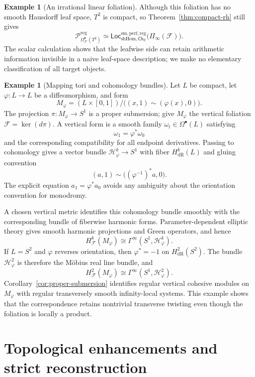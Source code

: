 \documentclass[12pt]{amsart}
\theoremstyle{definition}
\newtheorem{example}[thm]{Example}
\theoremstyle{remark}
\numberwithin{equation}{section}
\newcommand{\CF}{{\mathcal F}}
\newcommand{\R}{{\mathbb{R}}}
\newcommand{\1}{{\mathbb{1}}}
\newcommand{\Ch}{\mathsf{Ch}}
\newcommand{\Loc}{\mathsf{Loc}}
\begin{document}
\begin{example}[An irrational linear foliation]
Although this foliation has no smooth Hausdorff leaf space, $T^2$ is
compact, so Theorem~\ref{thm:compact-rh} still gives
\[
 \mathcal P_{\Omega^\bullet_{\CF}(T^2)}^{\mathrm{reg}}
 \simeq
 \Loc_{\mathrm{shHom},\Ch_{\R}}^{\mathrm{sm,perf,reg}}
 \bigl(\Pi_\infty(\CF)\bigr).
\]
The scalar calculation shows that the leafwise side can retain
arithmetic information invisible in a naive leaf-space description;
we make no elementary classification of all target objects.
\end{example}

\begin{example}[Mapping tori and cohomology bundles]
\label{ex:mapping-torus}
Let $L$ be compact, let $\varphi:L\to L$ be a diffeomorphism, and
form
\[
 M_\varphi
 =
 (L\times[0,1])/
 \bigl((x,1)\sim(\varphi(x),0)\bigr).
\]
The projection $\pi:M_\varphi\to S^1$ is a proper submersion; give
$M_\varphi$ the vertical foliation $\CF=\ker(d\pi)$.  A vertical form
is a smooth family $\omega_t\in\Omega^\bullet(L)$ satisfying
\[
 \omega_1=\varphi^*\omega_0
\]
and the corresponding compatibility for all endpoint derivatives.
Passing to cohomology gives a vector bundle
$\mathcal H_\varphi^k\to S^1$ with fiber
$H^k_{\mathrm{dR}}(L)$ and gluing convention
\[
 (a,1)\sim\bigl((\varphi^{-1})^*a,0\bigr).
\]
The explicit equation $a_1=\varphi^*a_0$ avoids any ambiguity about
the orientation convention for monodromy.

A chosen vertical metric identifies this cohomology bundle smoothly
with the corresponding bundle of fiberwise harmonic forms.
Parameter-dependent elliptic theory gives smooth harmonic
projections and Green operators, and hence
\[
 H^k_{\CF}(M_\varphi)
 \cong
 \Gamma^\infty(S^1,\mathcal H_\varphi^k).
\]
If $L=S^2$ and $\varphi$ reverses orientation, then
$\varphi^*=-1$ on $H^2_{\mathrm{dR}}(S^2)$.  The bundle
$\mathcal H_\varphi^2$ is therefore the M\"obius real line bundle, and
\[
 H^2_{\CF}(M_\varphi)
 \cong
 \Gamma^\infty(S^1,\mathcal H_\varphi^2).
\]
Corollary~\ref{cor:proper-submersion} identifies regular vertical
cohesive modules on $M_\varphi$ with regular transversely smooth
infinity-local systems.  This example shows that the correspondence
retains nontrivial transverse twisting even though the foliation is
locally a product.
\end{example}

\section{Topological enhancements and strict reconstruction}
\label{sec:topological-enhancements}
\end{document}

